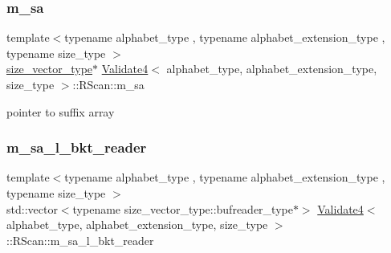 \mbox{\label{struct_validate4_1_1_r_scan_ab656e7db03298be8ce72f202e5aa5e77}} 
\subsubsection{\texorpdfstring{m\+\_\+sa}{m\_sa}}
{\footnotesize\ttfamily template$<$typename alphabet\+\_\+type , typename alphabet\+\_\+extension\+\_\+type , typename size\+\_\+type $>$ \\
\hyperlink{class_validate4_a46ea31a0a4b23f583806792160421d15}{size\+\_\+vector\+\_\+type}$\ast$ \hyperlink{class_validate4}{Validate4}$<$ alphabet\+\_\+type, alphabet\+\_\+extension\+\_\+type, size\+\_\+type $>$\+::R\+Scan\+::m\+\_\+sa\hspace{0.3cm}{\ttfamily [private]}}



pointer to suffix array 

\mbox{\label{struct_validate4_1_1_r_scan_adbffde97174383da7a58437bf76ab0fe}} 
\subsubsection{\texorpdfstring{m\+\_\+sa\+\_\+l\+\_\+bkt\+\_\+reader}{m\_sa\_l\_bkt\_reader}}
{\footnotesize\ttfamily template$<$typename alphabet\+\_\+type , typename alphabet\+\_\+extension\+\_\+type , typename size\+\_\+type $>$ \\
std\+::vector$<$typename size\+\_\+vector\+\_\+type\+::bufreader\+\_\+type$\ast$$>$ \hyperlink{class_validate4}{Validate4}$<$ alphabet\+\_\+type, alphabet\+\_\+extension\+\_\+type, size\+\_\+type $>$\+::R\+Scan\+::m\+\_\+sa\+\_\+l\+\_\+bkt\+\_\+reader\hspace{0.3cm}{\ttfamily [private]}}

\mbox{\label{struct_validate4_1_1_r_scan_a02e30a17efa641c20f6b979a21be9082}} 
